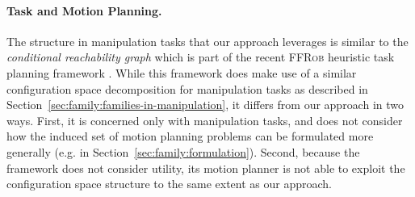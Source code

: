 \paragraph{Task and Motion Planning.}
The structure in manipulation tasks that our approach leverages
is similar to the \emph{conditional reachability graph} which is
part of the recent \textsc{FFRob} heuristic task planning framework
\citep{garrett2014ffrob}.
While this framework does make use of a similar configuration
space decomposition for manipulation tasks
as described in Section~\ref{sec:family:families-in-manipulation},
it differs from our approach in two ways.
First,
it is concerned only with manipulation tasks,
and does not consider how the induced set of motion planning problems
can be formulated more generally
(e.g. in Section~\ref{sec:family:formulation}).
Second,
because the framework does not consider utility,
its motion planner is not able to exploit the configuration space
structure to the same extent as our approach.

%

%
%
%

